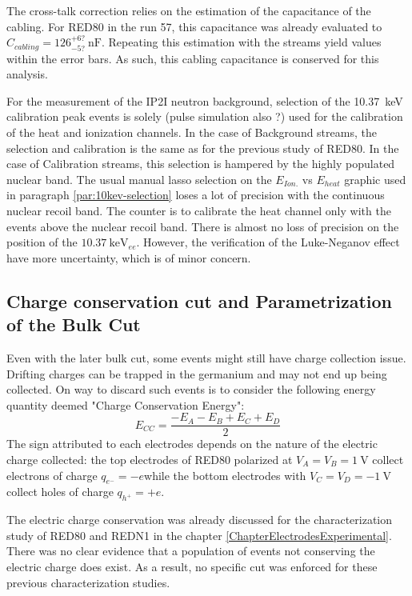 The cross-talk correction relies on the estimation of the capacitance of the cabling. For RED80 in the run 57, this capacitance was already evaluated to  $C_{cabling} = 126_{-5?}^{+6?} \ \si{\nano\farad}$. Repeating this estimation with the streams yield values within the error bars. As such, this cabling capacitance is conserved for this analysis.

For the measurement of the IP2I neutron background, selection of the \SI{10.37}{\kilo\eV} calibration peak events  is solely (pulse simulation also ?) used for the calibration of the heat and ionization channels.
In the case of Background streams, the selection and calibration is the same as for the previous study of RED80.
In the case of Calibration streams, this selection is hampered by the highly populated nuclear band. The usual manual lasso selection on the $E_{Ion.}$ vs $E_{heat}$ graphic used in paragraph \ref{par:10kev-selection} loses a lot of precision with the continuous nuclear recoil band.
The counter is to calibrate the heat channel only with the events above the nuclear recoil band. There is almost no loss of precision on the position of the $\SI{10.37}{\kilo\eV}_{ee}$. However, the verification of the Luke-Neganov effect have more uncertainty, which is of minor concern.


\subsection{Charge conservation cut and Parametrization of the Bulk Cut}
\label{par:charge-conservation-cut}
\label{par:param-bulk-cut}

Even with the later bulk cut, some events might still have charge collection issue. Drifting charges can be trapped in the germanium and may not end up being collected. On way to discard such events is to consider the following energy quantity deemed "Charge Conservation Energy":
\begin{equation}
E_{CC} = \frac{-E_A-E_B+E_C+E_D}{2}
\end{equation}
The sign attributed to each electrodes depends on the nature of the electric charge collected: the top electrodes of RED80 polarized at $V_A = V_B = \SI{1}{\volt}$ collect electrons of charge $q_{e^-} = -e$while the bottom electrodes with $V_C = V_D = \SI{-1}{\volt}$ collect holes of charge $q_{h^+} = +e$.

The electric charge conservation was already discussed for the characterization study of RED80 and REDN1 in the chapter \ref{ChapterElectrodesExperimental}. There was no clear evidence that a population of events not conserving the electric charge does exist. As a result, no specific cut was enforced for these previous characterization studies.

